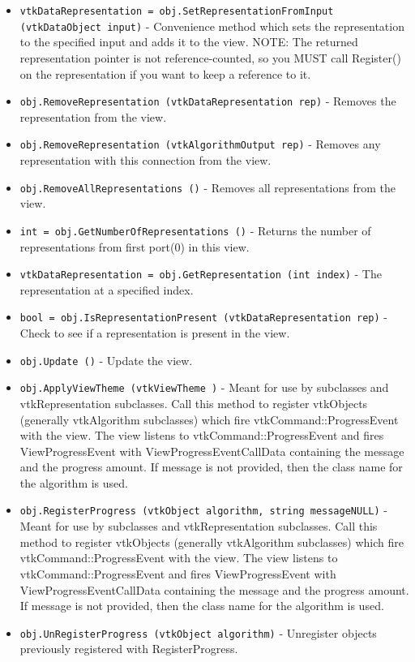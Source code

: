 \begin{itemize}
\item  \verb|vtkDataRepresentation = obj.SetRepresentationFromInput (vtkDataObject input)| -  Convenience method which sets the representation to the 
 specified input and adds it to the view.
 NOTE: The returned representation pointer is not reference-counted, 
 so you MUST call Register() on the representation if you want to 
 keep a reference to it.

\item  \verb|obj.RemoveRepresentation (vtkDataRepresentation rep)| -  Removes the representation from the view.

\item  \verb|obj.RemoveRepresentation (vtkAlgorithmOutput rep)| -  Removes any representation with this connection from the view.

\item  \verb|obj.RemoveAllRepresentations ()| -  Removes all representations from the view.

\item  \verb|int = obj.GetNumberOfRepresentations ()| -  Returns the number of representations from first port(0) in this view.

\item  \verb|vtkDataRepresentation = obj.GetRepresentation (int index)| -  The representation at a specified index.

\item  \verb|bool = obj.IsRepresentationPresent (vtkDataRepresentation rep)| -  Check to see if a representation is present in the view.

\item  \verb|obj.Update ()| -  Update the view.

\item  \verb|obj.ApplyViewTheme (vtkViewTheme )| -  Meant for use by subclasses and vtkRepresentation subclasses.
 Call this method to register vtkObjects (generally
 vtkAlgorithm subclasses) which fire vtkCommand::ProgressEvent with the
 view. The view listens to vtkCommand::ProgressEvent and fires
 ViewProgressEvent with ViewProgressEventCallData containing the message and
 the progress amount. If message is not provided, then the class name for
 the algorithm is used.

\item  \verb|obj.RegisterProgress (vtkObject algorithm, string messageNULL)| -  Meant for use by subclasses and vtkRepresentation subclasses.
 Call this method to register vtkObjects (generally
 vtkAlgorithm subclasses) which fire vtkCommand::ProgressEvent with the
 view. The view listens to vtkCommand::ProgressEvent and fires
 ViewProgressEvent with ViewProgressEventCallData containing the message and
 the progress amount. If message is not provided, then the class name for
 the algorithm is used.

\item  \verb|obj.UnRegisterProgress (vtkObject algorithm)| -  Unregister objects previously registered with RegisterProgress.

\end{itemize}
